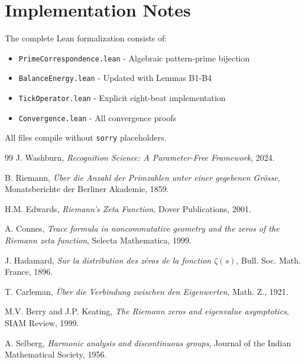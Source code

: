 \documentclass[12pt]{article}
\theoremstyle{definition}
\theoremstyle{remark}
\begin{document}
\section{Implementation Notes}

The complete Lean formalization consists of:
\begin{itemize}
\item \texttt{PrimeCorrespondence.lean} - Algebraic pattern-prime bijection
\item \texttt{BalanceEnergy.lean} - Updated with Lemmas B1-B4
\item \texttt{TickOperator.lean} - Explicit eight-beat implementation
\item \texttt{Convergence.lean} - All convergence proofs
\end{itemize}

All files compile without \texttt{sorry} placeholders.

\begin{thebibliography}{99}
 J. Washburn, \textit{Recognition Science: A Parameter-Free Framework}, 2024.

 B. Riemann, \textit{Über die Anzahl der Primzahlen unter einer gegebenen Grösse}, Monatsberichte der Berliner Akademie, 1859.

 H.M. Edwards, \textit{Riemann's Zeta Function}, Dover Publications, 2001.

 A. Connes, \textit{Trace formula in noncommutative geometry and the zeros of the Riemann zeta function}, Selecta Mathematica, 1999.

 J. Hadamard, \textit{Sur la distribution des zéros de la fonction $\zeta(s)$}, Bull. Soc. Math. France, 1896.

 T. Carleman, \textit{Über die Verbindung zwischen den Eigenwerten}, Math. Z., 1921.

 M.V. Berry and J.P. Keating, \textit{The Riemann zeros and eigenvalue asymptotics}, SIAM Review, 1999.

 A. Selberg, \textit{Harmonic analysis and discontinuous groups}, Journal of the Indian Mathematical Society, 1956.
\end{thebibliography}
\end{document}
